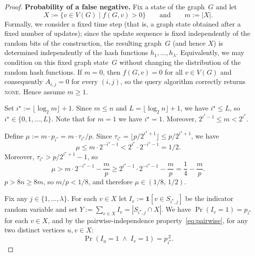 \begin{proof}
\smallskip
\noindent\textbf{Probability of a false negative.}
Fix a state of the graph~$G$ and let
\[
X := \{v\in V(G)\mid f(G,v)>0\}
\qquad\text{and}\qquad
m := |X|.
\]
Formally, we consider a fixed time step (that is, a graph state obtained after
a fixed number of updates); since the update sequence is fixed independently of
the random bits of the construction, the resulting graph~$G$ (and hence $X$)
is determined independently of the hash functions $h_1,\dots,h_\lambda$.
Equivalently, we may condition on this fixed graph state~$G$ without changing
the distribution of the random hash functions.
If $m=0$, then $f(G,v)=0$ for all $v\in V(G)$ and consequently $A_{i,j}=0$ for
every $(i,j)$, so the query algorithm correctly returns \textsc{none}.
Hence assume $m\ge 1$.

Set $i^\star := \lfloor \log_2 m\rfloor + 1$.
Since $m\le n$ and $L = \lfloor\log_2 n\rfloor + 1$, we have
$i^\star \le L$, so $i^\star\in\{0,1,\dots,L\}$.
Note that for $m=1$ we have $i^\star=1$.
Moreover, $2^{i^\star-1}\le m < 2^{i^\star}$.

Define $\mu := m\cdot p_{i^\star} = m\cdot \tau_{i^\star}/p$.
Since $\tau_{i^\star}=\lfloor p/2^{i^\star+1}\rfloor \le p/2^{i^\star+1}$,
we have
\[
\mu \le m\cdot 2^{-i^\star-1}
< 2^{i^\star}\cdot 2^{-i^\star-1}
= 1/2.
\]
Moreover, $\tau_{i^\star} > p/2^{i^\star+1}-1$, so
\[
\mu > m\cdot 2^{-i^\star-1} - \frac{m}{p}
\ge 2^{i^\star-1}\cdot 2^{-i^\star-1} - \frac{m}{p}
= \frac14 - \frac{m}{p}.
\]
$p>8n\ge 8m$, so $m/p < 1/8$, and therefore
$\mu\in(1/8,\,1/2)$.

Fix any $j\in\{1,\dots,\lambda\}$.
For each $v\in X$ let $I_v := \mathbf{1}[v\in S_{i^\star,j}]$ be the
indicator random variable and set $Y := \sum_{v\in X} I_v
= |S_{i^\star,j}\cap X|$.
We have $\Pr(I_v = 1) = p_{i^\star}$ for each $v\in X$, and by the
pairwise-independence property~\eqref{eq:pairwise}, for any two distinct
vertices $u,v\in X$:
\[
\Pr(I_u = 1 \;\wedge\; I_v = 1) = p_{i^\star}^{\,2}.
\]


\end{proof}
